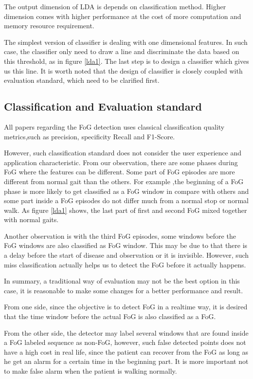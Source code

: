 \documentclass[article]{article}
\begin{document}
The output dimension of LDA is depends on classification method. Higher dimension comes with higher performance at the cost of more computation and memory resource requirement.

The simplest version of classifier is dealing with one dimensional features. In such case, the classifier only need to draw a line and discriminate the data based on this threshold, as in figure \ref{lda1}. The last step is to design a classifier which gives us this line. It is worth noted that the design of classifier is closely coupled with evaluation standard, which need to be clarified first.



\subsection{Classification and Evaluation standard}



	All papers regarding the FoG detection uses classical classification quality metrics,such as precision, specificity Recall and F1-Score.
	
	However, such classification standard does not consider the user experience and application characteristic. From our observation, there are some phases during FoG where the features can be different. Some part of FoG episodes are more different from normal gait than the others. For example ,the beginning of a FoG phase is more likely to get classified as a FoG window in compare with others and some part inside a FoG episodes do not differ much from a normal stop or normal walk. As figure \ref{lda1} shows, the last part of first and second FoG  mixed together with normal gaits. 
	
	Another observation is with the third FoG episodes, some windows before the FoG windows are also classified as FoG window. This may be due to that there is a delay before the start of disease and observation or it is invisible. However, such miss classification actually helps us to detect the FoG before it actually happens.

	In summary, a traditional way of evaluation may not be the best option in this case, it is reasonable to make some changes for a better performance and result.
	
	From one side, since the objective is to detect FoG in a realtime way, it is desired that the time window before the actual FoG is also classified as a FoG.
	
	From the other side, the detector may label several windows that are found inside a FoG labeled sequence as non-FoG, however, such false detected points does not have a high cost in real life, since the patient can recover from the FoG as long as he get an alarm for a certain time in the beginning part. It is more important not to make false alarm when the patient is walking normally. 
	
\end{document}
